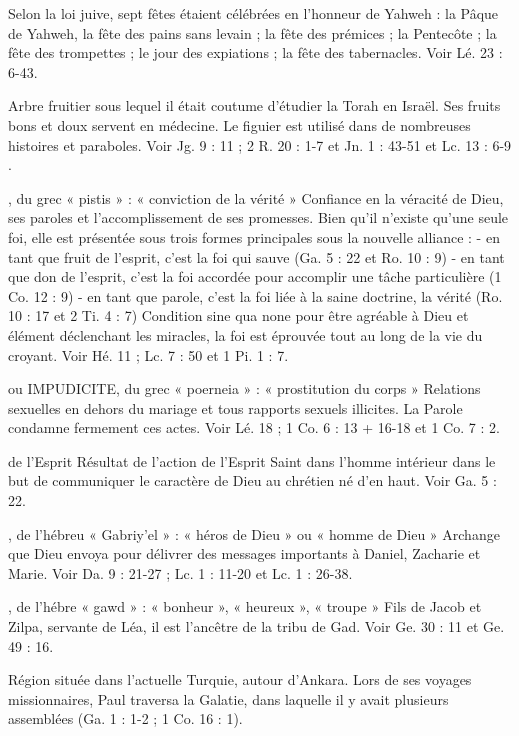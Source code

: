 \begin{multicols}{2}
Selon la loi juive, sept fêtes étaient célébrées en l’honneur de Yahweh : la Pâque de Yahweh, la fête des pains sans levain ; la fête des prémices ; la Pentecôte ; la fête des trompettes ; le jour des expiations ; la fête des tabernacles. Voir Lé. 23 : 6-43.


Arbre fruitier sous lequel il était coutume d’étudier la Torah en Israël. Ses fruits bons et doux servent en médecine. Le figuier est utilisé dans de nombreuses histoires et paraboles. Voir Jg. 9 : 11 ; 2 R. 20 : 1-7 et Jn. 1 : 43-51 et Lc. 13 : 6-9 .


, du grec « pistis » : « conviction de la vérité »
Confiance en la véracité de Dieu, ses paroles et l’accomplissement de ses promesses. Bien qu’il n’existe qu’une seule foi, elle est présentée sous trois formes principales sous la nouvelle alliance :
- en tant que fruit de l’esprit, c’est la foi qui sauve (Ga. 5 : 22 et Ro. 10 : 9)
- en tant que don de l’esprit, c’est la foi accordée pour accomplir une tâche particulière (1 Co. 12 : 9)
- en tant que parole, c’est la foi liée à la saine doctrine, la vérité (Ro. 10 : 17 et 2 Ti. 4 : 7)
Condition sine qua none pour être agréable à Dieu et élément déclenchant les miracles, la foi est éprouvée tout au long de la vie du croyant. Voir Hé. 11 ; Lc. 7 : 50 et 1 Pi. 1 : 7.


ou IMPUDICITE, du grec « poerneia » : « prostitution du corps »
Relations sexuelles en dehors du mariage et tous rapports sexuels illicites. La Parole condamne fermement ces actes. Voir Lé. 18 ; 1 Co. 6 : 13 + 16-18 et 1 Co. 7 : 2.


de l'Esprit
Résultat de l'action de l'Esprit Saint dans l’homme intérieur dans le but de communiquer le caractère de Dieu au chrétien né d’en haut. Voir Ga. 5 : 22.


, de l'hébreu « Gabriy'el » : « héros de Dieu » ou « homme de Dieu »
Archange que Dieu envoya pour délivrer des messages importants à Daniel, Zacharie et Marie. Voir Da. 9 : 21-27 ; Lc. 1 : 11-20 et Lc. 1 : 26-38.


, de l’hébre « gawd » : « bonheur », « heureux », « troupe »
Fils de Jacob et Zilpa, servante de Léa, il est l'ancêtre de la tribu de Gad. Voir Ge. 30 : 11 et Ge. 49 : 16.


Région située dans l'actuelle Turquie, autour d'Ankara. Lors de ses voyages missionnaires, Paul traversa la Galatie, dans laquelle il y avait plusieurs assemblées (Ga. 1 : 1-2 ; 1 Co. 16 : 1).



\end{multicols}
